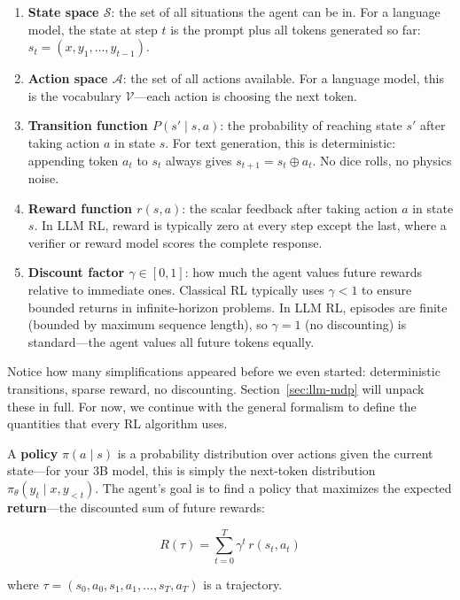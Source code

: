 \begin{enumerate}[nosep]
  \item \textbf{State space $\mathcal{S}$}: the set of all situations the agent can be in. For a language model, the state at step $t$ is the prompt plus all tokens generated so far: $s_t = (x, y_1, \ldots, y_{t-1})$.
  \item \textbf{Action space $\mathcal{A}$}: the set of all actions available. For a language model, this is the vocabulary $\mathcal{V}$---each action is choosing the next token.
  \item \textbf{Transition function $P(s' \mid s, a)$}: the probability of reaching state $s'$ after taking action $a$ in state $s$. For text generation, this is deterministic: appending token $a_t$ to $s_t$ always gives $s_{t+1} = s_t \oplus a_t$. No dice rolls, no physics noise.
  \item \textbf{Reward function $r(s, a)$}: the scalar feedback after taking action $a$ in state $s$. In LLM RL, reward is typically zero at every step except the last, where a verifier or reward model scores the complete response.
  \item \textbf{Discount factor $\gamma \in [0, 1]$}: how much the agent values future rewards relative to immediate ones. Classical RL typically uses $\gamma < 1$ to ensure bounded returns in infinite-horizon problems. In LLM RL, episodes are finite (bounded by maximum sequence length), so $\gamma = 1$ (no discounting) is standard---the agent values all future tokens equally.
\end{enumerate}

Notice how many simplifications appeared before we even started: deterministic transitions, sparse reward, no discounting. Section~\ref{sec:llm-mdp} will unpack these in full. For now, we continue with the general formalism to define the quantities that every RL algorithm uses.

A \textbf{policy} $\pi(a \mid s)$ is a probability distribution over actions given the current state---for your 3B model, this is simply the next-token distribution $\pi_\theta(y_t \mid x, y_{<t})$. The agent's goal is to find a policy that maximizes the expected \textbf{return}---the discounted sum of future rewards:

\begin{equation}
\label{eq:return}
R(\tau) = \sum_{t=0}^{T} \gamma^t \, r(s_t, a_t)
\end{equation}

where $\tau = (s_0, a_0, s_1, a_1, \ldots, s_T, a_T)$ is a trajectory.

